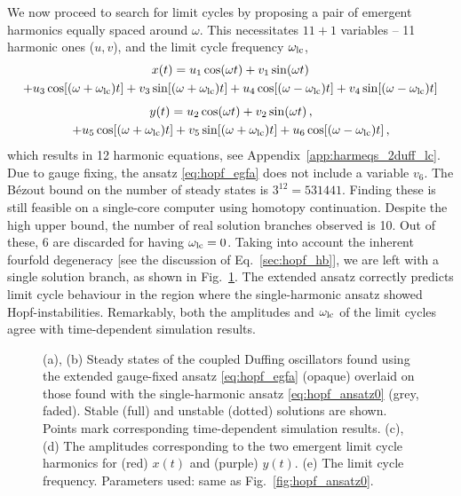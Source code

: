 We now proceed to search for limit cycles by proposing a pair of emergent harmonics equally spaced around $\omega$. This necessitates $11+1$ variables -- 11 harmonic ones ($u, v$), and the limit cycle frequency $\omega_{\rm lc}$,
\begin{multline*}
x(t) = u_1 \cos(\omega t) + v_1 \sin(\omega t) \\
 + u_3 \cos[(\omega + \omega_{\rm lc}) t] + v_3 \sin[(\omega + \omega_{\rm lc}) t] + u_4 \cos[(\omega - \omega_{\rm lc}) t] + v_4 \sin[(\omega - \omega_{\rm lc}) t]
\end{multline*}
\vspace*{-1em}
\begin{multline} \label{eq:hopf_egfa}
y(t) = u_2 \cos(\omega t) + v_2 \sin(\omega t) \,, \\
 + u_5 \cos[(\omega + \omega_{\rm lc}) t] + v_5 \sin[(\omega + \omega_{\rm lc}) t] + u_6 \cos[(\omega - \omega_{\rm lc}) t] \,,
\end{multline}
which results in 12 harmonic equations, see Appendix~\ref{app:harmeqs_2duff_lc}. Due to gauge fixing, the ansatz \eqref{eq:hopf_egfa} does not include a variable $v_6$. The B\'{e}zout bound on the number of steady states is $3^{12} = 531441$. Finding these is still feasible on a single-core computer using homotopy continuation. Despite the high upper bound, the number of real solution branches observed is 10. Out of these, 6 are discarded for having $\omega_{\rm lc} = 0$. Taking into account the inherent fourfold degeneracy [see the discussion of Eq.~\eqref{sec:hopf_hb}], we are left with a single solution branch, as shown in Fig.~\ref{fig:hopf_lc_ss}. The extended ansatz correctly predicts limit cycle behaviour in the region where the single-harmonic ansatz showed Hopf-instabilities. Remarkably, both the amplitudes and $\omega_{\rm lc}$ of the limit cycles agree with time-dependent simulation results.

\begin{figure} [h!]
	\centering
	
	\caption{(a), (b) Steady states of the coupled Duffing oscillators found using the extended gauge-fixed ansatz \eqref{eq:hopf_egfa} (opaque) overlaid on those found with the single-harmonic ansatz \eqref{eq:hopf_ansatz0} (grey, faded). Stable (full) and unstable (dotted) solutions are shown. Points mark corresponding time-dependent simulation results. (c),(d) The amplitudes corresponding to the two emergent limit cycle harmonics for (red) $x(t)$ and (purple) $y(t)$. (e) The limit cycle frequency.  Parameters used: same as Fig.~\ref{fig:hopf_ansatz0}.}
	\label{fig:hopf_lc_ss}
\end{figure}

